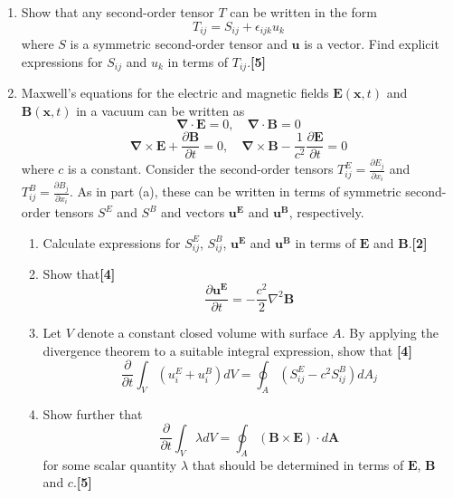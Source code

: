 \documentclass[a4paper]{article}
\begin{document}
\begin{qns}[Tensors]\leavevmode
\begin{enumerate}[label=(\alph*)]
\item Show that any second-order tensor $T$ can be written in the form
$$T_{ij} = S_{ij} + \epsilon_{ijk}u_k$$
where $S$ is a symmetric second-order tensor and $\mathbf{u}$ is a vector. Find explicit expressions for $S_{ij}$ and $u_k$ in terms of $T_{ij}$.\hfill\textbf{[5]}
\item Maxwell’s equations for the electric and magnetic fields $\mathbf{E}(\mathbf{x}, t)$ and $\mathbf{B}(\mathbf{x}, t)$ in a vacuum can be written as 
$$\boldsymbol{\nabla}\cdot\mathbf{E}=0,\quad\boldsymbol{\nabla}\cdot\mathbf{B}=0$$
$$\boldsymbol{\nabla}\times\mathbf{E}+\frac{\partial\mathbf{B}}{\partial t}=0,\quad\boldsymbol{\nabla}\times\mathbf{B}-\frac{1}{c^2}\frac{\partial\mathbf{E}}{\partial t}=0$$
where $c$ is a constant. Consider the second-order tensors $T^E_{ij} = \frac{\partial E_j}{\partial x_i}$ and $T^B_{ij} = \frac{\partial B_j}{\partial x_i}$. As in part (a), these can be written in terms of symmetric second-order tensors $S^E$ and $S^B$ and vectors $\mathbf{u^E}$ and $\mathbf{u^B}$, respectively.
\begin{enumerate}[label=(\roman*)]
\item  Calculate expressions for $S^E_{ij}$, $S^B_{ij}$, $\mathbf{u^E}$ and $\mathbf{u^B}$ in terms of $\mathbf{E}$ and $\mathbf{B}$.\hfill\textbf{[2]}
\item Show that\hfill\textbf{[4]}
$$\frac{\partial\mathbf{u^E}}{\partial t}=-\frac{c^2}{2}\nabla^2\mathbf{B}$$
\item Let $V$ denote a constant closed volume with surface $A$. By applying the divergence theorem to a suitable integral expression, show that \hfill\textbf{[4]}
$$\frac{\partial}{\partial t}\int_V(u_i^E+u_i^B)dV=\oint_A(S_{ij}^E-c^2S_{ij}^B)dA_j$$
\item Show further that
$$\frac{\partial}{\partial t}\int_V\lambda dV=\oint_A(\mathbf{B}\times\mathbf{E})\cdot d\mathbf{A}$$
for some scalar quantity $\lambda$ that should be determined in terms of $\mathbf{E}$, $\mathbf{B}$ and $c$.\hfill\textbf{[5]}
\end{enumerate}
\end{enumerate}
\end{qns}
\end{document}
